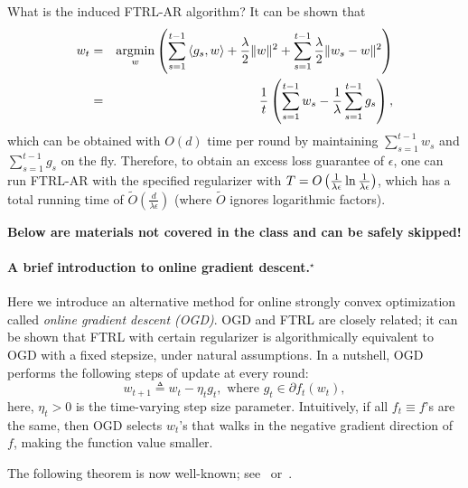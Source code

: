 \documentclass{article}
\DeclareMathOperator*{\argmin}{{\rm argmin}}
\newcommand{\defeq}{\triangleq}
\newcommand{\inner}[2]{\left\langle #1,#2 \right\rangle}
\begin{document}
What is the induced FTRL-AR algorithm? It can be shown that
\begin{eqnarray*}
  w_t &=& \argmin_w \del{ \sum_{s=1}^{t-1} \inner{g_s}{w} + \frac\lambda 2\| w \|^2 + \sum_{s=1}^{t-1} \frac\lambda 2\| w_s - w \|^2} \\
  &=& \frac{1}{t} \del{\sum_{s=1}^{t-1} w_s - \frac1\lambda \sum_{s=1}^{t-1} g_s},
\end{eqnarray*}
which can be obtained with $O(d)$ time per round
by maintaining $\sum_{s=1}^{t-1} w_s$ and $\sum_{s=1}^{t-1} g_s$ on the fly. Therefore, to obtain an excess loss guarantee of $\epsilon$, one can run FTRL-AR with the specified regularizer with $T = O\del{ \frac{1}{\lambda\epsilon}\ln\frac{1}{\lambda\epsilon}}$, which has a total running time of $\tilde{O}(\frac{d}{\lambda \epsilon})$
(where $\tilde{O}$ ignores logarithmic factors).

\newpage

\textbf{Below are materials not covered in the class and can be safely skipped!}


\paragraph{A brief introduction to online gradient descent.$^\star$} Here we introduce an alternative method for online strongly convex optimization called {\em online gradient descent (OGD)}. OGD and FTRL are closely related; it can be shown that FTRL with certain regularizer is algorithmically equivalent to OGD with a fixed stepsize, under natural assumptions. In a nutshell, OGD performs the following steps of update at every round:
\[ w_{t+1} \defeq w_t - \eta_t g_t, \text{ where } g_t \in \partial f_t(w_t), \]
here, $\eta_t > 0$ is the time-varying step size parameter. Intuitively, if all $f_t \equiv f$'s are the same, then OGD selects $w_t$'s that walks in the negative gradient direction of $f$, making the function value smaller.

The following theorem is now well-known; see~\cite[][Theorem 1]{hazan2007logarithmic} or~\cite[][Section 14.4.4 and 14.5.3]{shalev2014understanding}.
\end{document}
